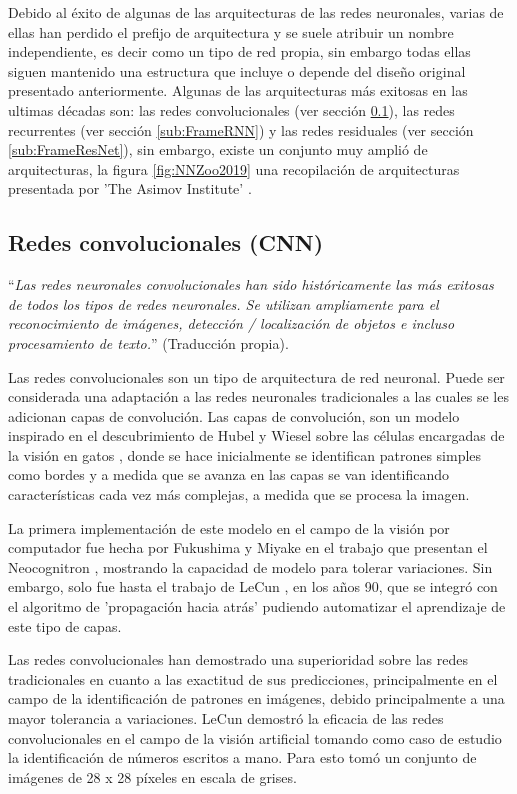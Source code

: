            Debido al éxito de algunas de las arquitecturas de las redes neuronales, varias de ellas han perdido el prefijo de arquitectura y se suele atribuir un nombre independiente, es decir como un tipo de red propia, sin embargo todas ellas siguen mantenido una estructura que incluye o depende del diseño original presentado anteriormente. Algunas de las arquitecturas más exitosas en las ultimas décadas son: las redes convolucionales (ver sección \ref{sub:FrameCNN}), las redes recurrentes (ver sección \ref{sub:FrameRNN}) y las redes residuales (ver sección \ref{sub:FrameResNet}), sin embargo, existe un conjunto muy amplió de arquitecturas, la figura \ref{fig:NNZoo2019} una recopilación de arquitecturas presentada por 'The Asimov Institute' \cite{NNZoo2019}.
        
    \subsection{Redes convolucionales (CNN)}
    \label{sub:FrameCNN}
    
        ``\textit{Las redes neuronales convolucionales han sido históricamente las más exitosas de todos los tipos de redes neuronales. Se utilizan ampliamente para el reconocimiento de imágenes, detección / localización de objetos e incluso procesamiento de texto.}'' \cite[Pág 41]{Aggarwal2018} (Traducción propia).
        
        Las redes convolucionales son un tipo de arquitectura de red neuronal. Puede ser considerada una adaptación a las redes neuronales tradicionales a las cuales se les adicionan capas de convolución. Las capas de convolución, son un modelo inspirado en el descubrimiento de Hubel y Wiesel sobre las células encargadas de la visión en gatos \cite{Hubel1962}, donde se hace inicialmente se identifican patrones simples como bordes y a medida que se avanza en las capas se van identificando características cada vez más complejas, a medida que se procesa la imagen. 
        
        La primera implementación de este modelo en el campo de la visión por computador fue hecha por Fukushima y Miyake en el trabajo que presentan el Neocognitron \cite{Fukushima1982}, mostrando la capacidad de modelo para tolerar variaciones. Sin embargo, solo fue hasta el trabajo de LeCun \cite{LeCun1998}, en los años 90, que se integró con el algoritmo de 'propagación hacia atrás'  pudiendo automatizar el aprendizaje de este tipo de capas.

        Las redes convolucionales han demostrado una superioridad sobre las redes tradicionales en cuanto a las exactitud de sus predicciones, principalmente en el campo de la identificación de patrones en imágenes, debido principalmente a una mayor tolerancia a variaciones. LeCun \cite{LeCun1998} demostró la eficacia de las redes convolucionales en el campo de la visión artificial tomando como caso de estudio la identificación de números escritos a mano. Para esto tomó un conjunto de imágenes de 28 x 28 píxeles en escala de grises. 
        
